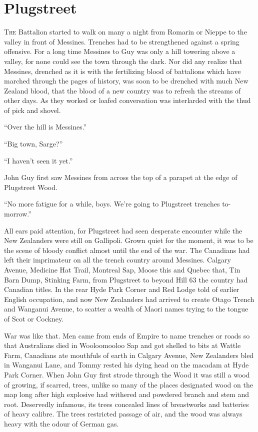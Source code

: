 \chapter*{\textsf{Plugstreet}}

T\textsc{he} Battalion started to walk on many a night from Romarin or Nieppe to the valley in front of Messines. Trenches had to be strengthened against a spring offensive. For a long time Messines to Guy was only a hill towering above a valley, for none could see the town through the dark. Nor did any realize that Messines, drenched as it is with the fertilizing blood of battalions which have marched through the pages of history, was soon to be drenched with much New Zealand blood, that the blood of a new country was to refresh the streams of other days. As they worked or loafed conversation was interlarded with the thud of pick and shovel.

``Over the hill is Messines.''

``Big town, Sarge?''

``I haven't seen it yet.''

John Guy first saw Messines from across the top of a parapet at the edge of Plugstreet Wood.

``No more fatigue for a while, boys. We're going to Plugstreet trenches to-morrow.''

All ears paid attention, for Plugstreet had seen desperate encounter while the New Zealanders were still on Gallipoli. Grown quiet for the moment, it was to be the scene of bloody conflict almost until the end of the war. The Canadians had left their imprimateur on all the trench country around Messines. Calgary Avenue, Medicine Hat Trail, Montreal Sap, Moose this and Quebec that, Tin Barn Dump, Stinking Farm,  from Plugstreet to beyond Hill 63 the country had Canadian titles. In the rear Hyde Park Corner and Red Lodge told of earlier English occupation, and now New Zealanders had arrived to create Otago Trench and Wanganui Avenue, to scatter a wealth of Maori names trying to the tongue of Scot or Cockney.

War was like that. Men came from ends of Empire to name trenches or roads so that Australians died in Wooloomooloo Sap and got shelled to bits at Wattle Farm, Canadians ate mouthfuls of earth in Calgary Avenue, New Zealanders bled in Wanganui Lane, and Tommy rested his dying head on the macadam at Hyde Park Corner. When John Guy first strode through the Wood it was still a wood of growing, if scarred, trees, unlike so many of the places designated wood on the map long after high explosive had withered and powdered branch and stem and root. Deservedly infamous, its trees concealed lines of breastworks and batteries of heavy calibre. The trees restricted passage of air, and the wood was always heavy with the odour of German gas.

